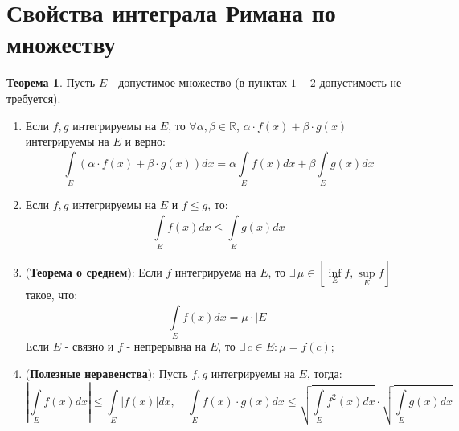 \documentclass[12pt]{article}
\newcommand{\MR}{\mathbb{R}}
\theoremstyle{definition}
\newtheorem{theorem}{Теорема}
\newcommand{\ddint}[2]{\displaystyle\int\limits_{#1}^{#2}}
\begin{document}
\section*{Свойства интеграла Римана по множеству}
\begin{theorem}
	Пусть $E$ - допустимое множество (в пунктах $1-2$ допустимость не требуется).
	\begin{enumerate}[label=\arabic*)]
		\item Если $f,g$ интегрируемы на $E$, то $\forall \alpha,\beta \in \MR$, $\alpha{\cdot}f(x) + \beta{\cdot}g(x)$ интегрируемы на $E$ и верно:
		$$
			\ddint{E}{}(\alpha{\cdot}f(x) + \beta{\cdot}g(x)) dx = \alpha \ddint{E}{}f(x)dx + \beta \ddint{E}{}g(x)dx
		$$ 
		\item Если $f,g$ интегрируемы на $E$ и $f \leq g$, то:
		$$
			\ddint{E}{}f(x)dx \leq \ddint{E}{}g(x)dx
		$$
		\item (\textbf{Теорема о среднем}): Если $f$ интегрируема на $E$, то $\exists \, \mu \in [\inf\limits_{E}f, \sup\limits_{E}f]$ такое, что:
		$$
			\ddint{E}{}f(x)dx = \mu{\cdot}|E|
		$$
		Если $E$ - связно и $f$ - непрерывна на $E$, то $\exists \, c \in E \colon \mu = f(c)$;
		\item (\textbf{Полезные неравенства}): Пусть $f,g$ интегрируемы на $E$, тогда:
		$$
			\left| \ddint{E}{}f(x)dx \right| \leq \ddint{E}{}|f(x)|dx, \quad \ddint{E}{}f(x){\cdot}g(x)dx \leq \sqrt{\ddint{E}{}f^2(x)dx}{\cdot}\sqrt{\ddint{E}{}g(x)dx}
		$$
	\end{enumerate}
\end{theorem}
\end{document}
